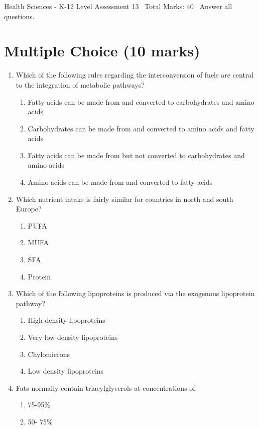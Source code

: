 \documentclass[12pt]{article}
\begin{document}
\begin{center}
Health Sciences - K-12 Level Assessment 13 \
Total Marks: 40 \
Answer all questions.
\end{center}

\section*{Multiple Choice (10 marks)}
\begin{enumerate}[label=\arabic*.]
\item Which of the following rules regarding the interconversion of fuels are central to the integration of metabolic pathways?
\begin{enumerate}[label=(\alph*)]
    \item Fatty acids can be made from and converted to carbohydrates and amino acids
    \item Carbohydrates can be made from and converted to amino acids and fatty acids
    \item Fatty acids can be made from but not converted to carbohydrates and amino acids
    \item Amino acids can be made from and converted to fatty acids
\end{enumerate}
\item Which nutrient intake is fairly similar for countries in north and south Europe?
\begin{enumerate}[label=(\alph*)]
    \item PUFA
    \item MUFA
    \item SFA
    \item Protein
\end{enumerate}
\item Which of the following lipoproteins is produced via the exogenous lipoprotein pathway?
\begin{enumerate}[label=(\alph*)]
    \item High density lipoproteins
    \item Very low density lipoproteins
    \item Chylomicrons
    \item Low density lipoproteins
\end{enumerate}
\item Fats normally contain triacylglycerols at concentrations of:
\begin{enumerate}[label=(\alph*)]
    \item 75-95\%
    \item 50- 75\%

\end{enumerate}
\end{enumerate}
\end{document}
